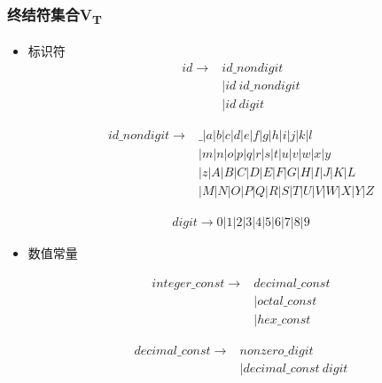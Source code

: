 \documentclass[UTF8,a4paper,10pt]{ctexart}
\begin{document}
\subsubsection{终结符集合V\textsubscript{T}}
\begin{itemize}

\item 标识符
\begin{equation*}
\begin{aligned}
        id \xrightarrow{}&id\_nondigit\\
                         &|id ~ id\_nondigit\\
                         &|id ~ digit
\end{aligned}
\end{equation*}       

\begin{equation*}
\begin{aligned}
        id\_nondigit\xrightarrow{}&\_|a|b|c|d|e|f|g|h|i|j|k|l\\
                                  &|m|n|o|p|q|r|s|t|u|v|w|x|y\\
                                  &|z|A|B|C|D|E|F|G|H|I|J|K|L\\
                                  &|M|N|O|P|Q|R|S|T|U|V|W|X|Y|Z
\end{aligned}
\end{equation*} 

\begin{equation*}
\begin{aligned}
        digit \xrightarrow{}0|1|2|3|4|5|6|7|8|9       
\end{aligned}
\end{equation*}  

\item 数值常量
\begin{center}
    

\begin{equation*}
\begin{aligned}
        integer\_const\xrightarrow{}&decimal\_const\\
                                  &|octal\_const\\
                                  &|hex\_const
\end{aligned}
\end{equation*} 

\begin{equation*}
\begin{aligned}
        decimal\_const\xrightarrow{}&nonzero\_digit\\
                                  &|decimal\_const ~ digit
\end{aligned}
\end{equation*} 


\end{center}
\end{itemize}
\end{document}
